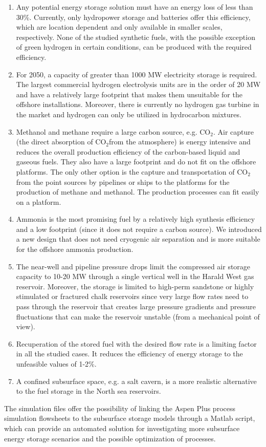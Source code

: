 \documentclass{ECOS_2021}
\begin{document}
\begin{enumerate}
\item Any potential energy storage solution must have an energy loss of
less than 30\%. Currently, only hydropower storage and batteries offer
this efficiency, which are location dependent and only available in
smaller scales, respectively. None of the studied synthetic fuels,
with the possible exception of green hydrogen in certain conditions,
can be produced with the required efficiency.
\item For 2050, a capacity of greater than 1000 MW electricity storage is
required. The largest commercial hydrogen electrolysis units are in
the order of 20 MW and have a relatively large footprint that makes
them unsuitable for the offshore installations. Moreover, there is
currently no hydrogen gas turbine in the market and hydrogen can only
be utilized in hydrocarbon mixtures. 
\item Methanol and methane require a large carbon source, e.g. CO$_{2}$.
Air capture (the direct absorption of CO$_{2}$from the atmosphere)
is energy intensive and reduces the overall production efficiency
of the carbon-based liquid and gaseous fuels. They also have a large
footprint and do not fit on the offshore platforms. The only other
option is the capture and transportation of CO$_{2}$ from the point
sources by pipelines or ships to the platforms for the production
of methane and methanol. The production processes can fit easily on
a platform. 
\item Ammonia is the most promising fuel by a relatively high synthesis
efficiency and a low footprint (since it does not require a carbon
source). We introduced a new design that does not need cryogenic air
separation and is more suitable for the offshore ammonia production. 
\item The near-well and pipeline pressure drops limit the compressed air
storage capacity to 10-20 MW through a single vertical well in the
Harald West gas reservoir. Moreover, the storage is limited to high-perm
sandstone or highly stimulated or fractured chalk reservoirs since
very large flow rates need to pass through the reservoir that creates
large pressure gradients and pressure fluctuations that can make the
reservoir unstable (from a mechanical point of view). 
\item Recuperation of the stored fuel with the desired flow rate is a limiting
factor in all the studied cases. It reduces the efficiency of energy
storage to the unfeasible values of 1-2\%. 
\item A confined subsurface space, e.g. a salt cavern, is a more realistic
alternative to the fuel storage in the North sea reservoirs.
\end{enumerate}
The simulation files offer the possibility of linking the Aspen Plus
process simulation flowsheets to the subsurface storage models through
a Matlab script, which can provide an automated solution for investigating
more subsurface energy storage scenarios and the possible optimization
of processes.
\end{document}
